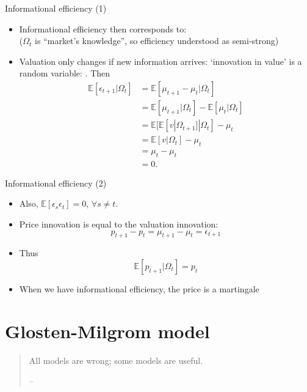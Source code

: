 \documentclass[english,10pt
,aspectratio=169
]{beamer}
\begin{document}
\begin{frame}{Informational efficiency (1)}
\begin{itemize}
	\item Informational efficiency then corresponds to: 
	\\
	($\Omega_t$ is ``market's knowledge'', so efficiency understood as semi-strong)
	\item Valuation only changes if new information arrives: `innovation in value' is a random variable: . Then
	\begin{align*}
		\mathbb{E}[\epsilon_{t+1}|\Omega_t] 
		& = \mathbb{E}[\mu_{t+1} - \mu_t|\Omega_t]\\
		& = \mathbb{E}[\mu_{t+1}|\Omega_t] - \mathbb{E}[\mu_t|\Omega_t]\\  
		& = \mathbb{E}[ \mathbb{E}[v|\Omega_{t+1}]|\Omega_t] - \mu_t\\  
		& = \mathbb{E}[v|\Omega_t] - \mu_t\\  
		& = \mu_t- \mu_t\\  
		& = 0.
	\end{align*}
\end{itemize}
\end{frame}


\begin{frame}{Informational efficiency (2)}
	\begin{itemize}
	 \item Also, $\mathbb{E}[\epsilon_{s}\epsilon_t]=0$, $\forall s \ne t$.
	\item Price innovation is equal to the valuation innovation:
	\[
	p_{t+1} - p_t = \mu_{t+1} - \mu_t = \epsilon_{t+1}
	\]
	\item Thus
	\[
	\mathbb{E}[p_{t+1}|\Omega_{t}] = p_t
	\]
	\item When we have informational efficiency, the price is a \alert{martingale}
\end{itemize}
\end{frame}



\section{Glosten-Milgrom model}

\begin{frame}{\cite{glosten_bid_1985}}
	\begin{quotation}
		All models are wrong; some models are useful.
		\begin{flushright}
			-- 
		\end{flushright}
	\end{quotation}
\end{frame}
\end{document}

